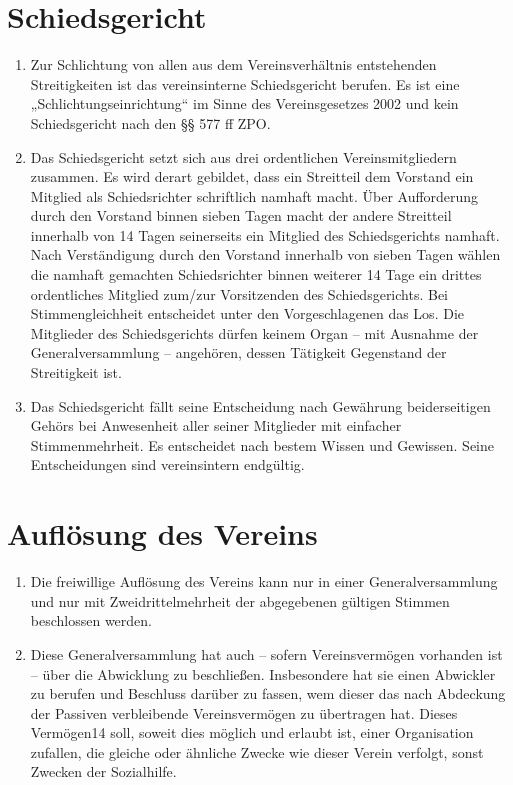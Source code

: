 \documentclass[a4paper,12pt]{article}
\begin{document}
\section{Schiedsgericht} %
\label{sec:Schiedsgericht}
\begin{enumerate}
\item Zur Schlichtung von allen aus dem Vereinsverhältnis entstehenden Streitigkeiten ist das vereinsinterne Schiedsgericht berufen. Es ist eine „Schlichtungseinrichtung“ im Sinne des Vereinsgesetzes 2002 und kein Schiedsgericht nach den §§ 577 ff ZPO.

\item Das Schiedsgericht setzt sich aus drei ordentlichen Vereinsmitgliedern zusammen. Es wird derart gebildet, dass ein Streitteil dem Vorstand ein Mitglied als Schiedsrichter schriftlich namhaft macht. Über Aufforderung durch den Vorstand binnen sieben Tagen macht der andere Streitteil innerhalb von 14 Tagen seinerseits ein Mitglied des Schiedsgerichts namhaft. Nach Verständigung durch den Vorstand innerhalb von sieben Tagen wählen die namhaft gemachten Schiedsrichter binnen weiterer 14 Tage ein drittes ordentliches Mitglied zum/zur Vorsitzenden des Schiedsgerichts. Bei Stimmengleichheit entscheidet unter den Vorgeschlagenen das Los. Die Mitglieder des Schiedsgerichts dürfen keinem Organ – mit Ausnahme der Generalversammlung – angehören, dessen Tätigkeit Gegenstand der Streitigkeit ist.

\item Das Schiedsgericht fällt seine Entscheidung nach Gewährung beiderseitigen Gehörs bei Anwesenheit aller seiner Mitglieder mit einfacher Stimmenmehrheit. Es entscheidet nach bestem Wissen und Gewissen. Seine Entscheidungen sind vereinsintern endgültig.
\end{enumerate}

\section{Auflösung des Vereins} %
\label{sec:Aufloesung}
\begin{enumerate}
\item Die freiwillige Auflösung des Vereins kann nur in einer Generalversammlung und nur mit Zweidrittelmehrheit der abgegebenen gültigen Stimmen beschlossen werden.

\item Diese Generalversammlung hat auch – sofern Vereinsvermögen vorhanden ist – über die Abwicklung zu beschließen. Insbesondere hat sie einen Abwickler zu berufen und Beschluss darüber zu fassen, wem dieser das nach Abdeckung der Passiven verbleibende Vereinsvermögen zu übertragen hat. Dieses Vermögen14 soll, soweit dies möglich und erlaubt ist, einer Organisation zufallen, die gleiche oder ähnliche Zwecke wie dieser Verein verfolgt, sonst Zwecken der Sozialhilfe.
\end{enumerate}
\end{document}

